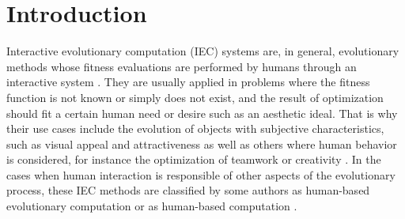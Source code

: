 \section{Introduction}




Interactive evolutionary computation (IEC) systems are, in general, evolutionary methods
whose fitness evaluations are performed by humans through an interactive 
system \cite{eiben2015interactive}.
They are usually applied in problems where the fitness function is not known or simply
does not exist, and the result of optimization should fit a certain human need or
desire such as an aesthetic ideal.  
That is why their use cases include the evolution of objects with subjective characteristics,
such as visual appeal and attractiveness \cite{biomorphs} as well as others where human behavior is 
considered, for instance the optimization of teamwork \cite{kosorukoff2002evolutionary}
or creativity \cite{yu2011cooks}. In the cases when 
human interaction is responsible of other 
aspects of the evolutionary process, these IEC methods are classified by some authors  
as human-based evolutionary computation \cite{972056} 
or as human-based computation \cite{quinn2011human}.

